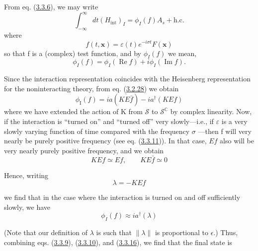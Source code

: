 \documentclass[11pt,a4paper]{article}
\begin{document}
\hypertarget{source-62}{}

From eq. (\hyperref[eq:3.3.6]{3.3.6}), we may write
\begin{equation*}
\int_{-\infty}^{\infty} dt (H_{\mathrm{int}})_{I} = \phi_{I}(f)A_{s} + \mathrm{h.c.} \tag{3.3.10}\label{eq:3.3.10}
\end{equation*}
where
\begin{equation*}
f(t,\mathbf{x}) = \varepsilon(t) e^{-i\sigma t} F(\mathbf{x}) \tag{3.3.11}\label{eq:3.3.11}
\end{equation*}
so that f is a (complex) test function, and by \(\phi_I(f)\) we mean,
\begin{equation*}
\phi_{I}(f) = \phi_{I}(\operatorname{Re} f) + i \phi_{I}(\operatorname{Im} f) . \tag{3.3.12}\label{eq:3.3.12}
\end{equation*}

Since the interaction representation coincides with the Heisenberg representation for the noninteracting theory, from eq. (\hyperref[eq:3.2.28]{3.2.28}) we obtain
\begin{equation*}
\phi_{\mathrm{I}}(f)=ia(\overline{KE\bar f})-ia^\dagger(KEf) \tag{3.3.13}\label{eq:3.3.13}
\end{equation*}
where we have extended the action of K from \(\mathcal{S}\) to \(\mathcal{S}^{\mathbb{C}}\) by complex linearity. Now, if the interaction is ``turned on'' and ``turned off'' very slowly---i.e., if \(\varepsilon\) is a very slowly varying function of time compared with the frequency \(\sigma\) ---then f will very nearly be purely positive frequency (see eq. (\hyperref[eq:3.3.11]{3.3.11})). In that case, \(Ef\) also will be very nearly purely positive frequency, and we obtain
\begin{equation*}
K E f\simeq E f,\qquad K E\bar f\simeq0 \tag{3.3.14}\label{eq:3.3.14}
\end{equation*}

Hence, writing
\begin{equation*}
\lambda = -KEf \tag{3.3.15}\label{eq:3.3.15}
\end{equation*}

we find that in the case where the interaction is turned on and off sufficiently slowly, we have
\begin{equation*}
\phi_I(f) \approx ia^{\dagger}(\lambda) \tag{3.3.16}\label{eq:3.3.16}
\end{equation*}

(Note that our definition of \(\lambda\) is such that \(\lVert \lambda\rVert\) is proportional to \(\epsilon\).) Thus, combining eqs. (\hyperref[eq:3.3.9]{3.3.9}), (\hyperref[eq:3.3.10]{3.3.10}), and (\hyperref[eq:3.3.16]{3.3.16}), we find that the final state is
\end{document}
